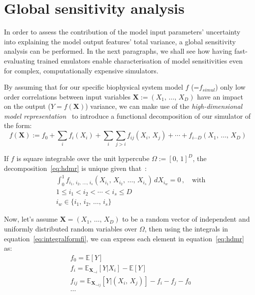 %
%
%
\section{Global sensitivity analysis}\label{sec:ch3globalsensitivityanalysis}
In order to assess the contribution of the model input parameters' uncertainty into explaining the model output features' total variance, a global sensitivity analysis can be performed. In the next paragraphs, we shall see how having fast-evaluating trained emulators enable characterisation of model sensitivities even for complex, computationally expensive simulators.

\vspace{0.2cm}
By assuming that for our specific biophysical system model $f$ (=$f_{simul}$) only low order correlations between input variables $\mathbf{X}:=(X_1,\,\dots,\,X_D)$ have an impact on the output ($Y=f(\mathbf{X})$) variance, we can make use of the \textit{high-dimensional model representation}~\cite{Rabitz:1999} to introduce a functional decomposition of our simulator of the form:
%
\begin{equation}\label{eq:hdmr}
    f(\mathbf{X}) := f_{0} + \sum_{i}f_{i}(X_{i}) + \sum_{i}\sum_{j>i}f_{ij}(X_{i},\,X_{j}) + \cdots + f_{i\cdots D}(X_1,\,\dots,\,X_D)
\end{equation}

\noindent
If $f$ is square integrable over the unit hypercube $\Omega := [0,\,1]^{D}$, the decomposition~\eqref{eq:hdmr} is unique given that~\cite{Sobol:2003}:
%
\begin{align}\label{eq:integralformfi}
    & \int_0^1 f_{i_1,\,i_2,\,\dots,\,i_s}(X_{i_1},\,X_{i_2},\,\dots,\,X_{i_s})\,dX_{i_{w}} = 0\,,\quad\text{with} \\
    & 1 \le i_1 < i_2 < \cdots < i_s \le D \\
    & i_{w} \in \{i_1,\,i_2,\,\dots,\,i_s\}
\end{align}

\noindent
Now, let's assume $\mathbf{X} = (X_1,\,\dots,\,X_D)$ to be a random vector of independent and uniformly distributed random variables over $\Omega$, then using the integrals in equation~\eqref{eq:integralformfi}, we can express each element in equation~\eqref{eq:hdmr} as:
%
\begin{align}
    & f_{0} = \mathbb{E}[Y] \label{eq:f0var}\\
    & f_{i} = \mathbb{E}_{\mathbf{X}_{\sim i}}[Y|X_i] - \mathbb{E}[Y] \\
    & f_{ij} = \mathbb{E}_{\mathbf{X}_{\sim ij}}[Y|(X_i,\,X_j)] - f_i - f_j - f_0 \\
    &\dots
\end{align}
 
